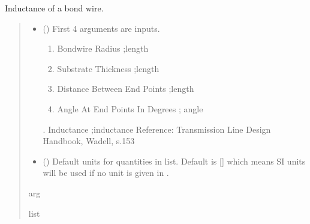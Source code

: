 \documentclass[letterpaper,10pt,english]{sphinxmanual}
\begin{document}
\begin{fulllineitems}
\label{\detokenize{components:components.L_BondWire}}
\pysigstartsignatures
{}
\pysigstopsignatures
\sphinxAtStartPar
Inductance of a bond wire.
\begin{quote}\begin{description}
\begin{itemize}
\item {}
\sphinxAtStartPar
{} () \textendash{}
\sphinxAtStartPar
First 4 arguments are inputs.
\begin{enumerate}
%
\item {}
\sphinxAtStartPar
Bondwire Radius ;length

\item {}
\sphinxAtStartPar
Substrate Thickness ;length

\item {}
\sphinxAtStartPar
Distance Between End Points ;length

\item {}
\sphinxAtStartPar
Angle At End Points In Degrees ; angle

\end{enumerate}

. Inductance ;inductance
Reference:  Transmission Line Design Handbook, Wadell, s.153


\item {}
\sphinxAtStartPar
{} (\sphinxstyleliteralemphasis{\sphinxupquote{, }}) \textendash{} Default units for quantities in  list. Default is {[}{]} which means SI units will be used if no unit is given in .

\end{itemize}

\sphinxAtStartPar
arg

\sphinxAtStartPar
list

\end{description}\end{quote}

\end{fulllineitems}
\end{document}
